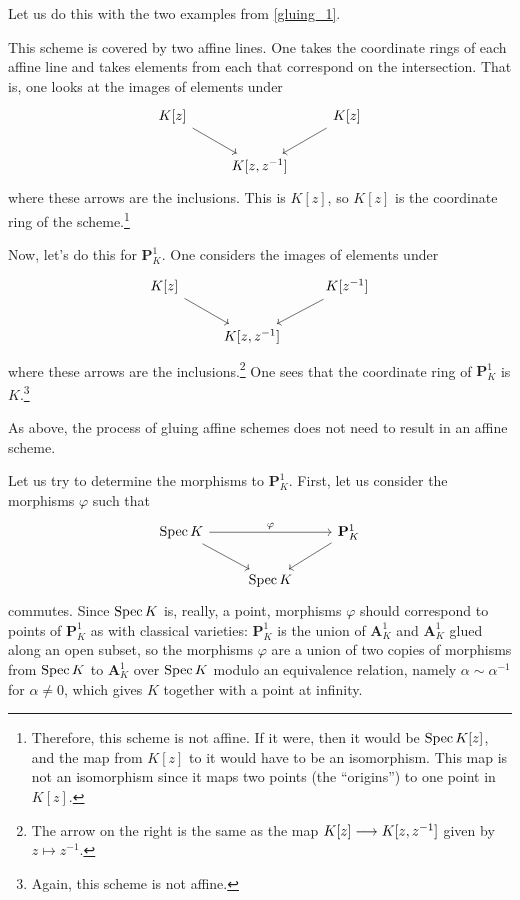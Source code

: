 \documentclass [11 pt, oneside] {article}
\begin{document}
Let us do this with the two examples from \cref{gluing_1}.

\begin{example}\label{}\text{}
This scheme is covered by two affine lines. One takes the coordinate rings of each affine line and takes elements from each that correspond on the intersection. That is, one looks at the images of elements under
\[
\begin{tikzcd}
	K[z]\ar[dr] && K[z] \ar[dl]\\
	&K[z,z^{-1}]
\end{tikzcd}
\]
where these arrows are the inclusions. This is $K[z]$, so $K[z]$ is the coordinate ring of the scheme.\footnote{Therefore, this scheme is not affine. If it were, then it would be $\operatorname{Spec} K[z]$, and the map from $K[z]$ to it would have to be an isomorphism. This map is not an isomorphism since it maps two points (the ``origins'') to one point in $K[z]$.}
\end{example}

\begin{example}[ ]\label{}\text{}
Now, let's do this for $\mathbf{P}^1_K$. One considers the images of elements under
\[
\begin{tikzcd}
        K[z]\ar[dr] && K[z^{-1}] \ar[dl]\\
        &K[z,z^{-1}]
\end{tikzcd}
\]
where these arrows are the inclusions.\footnote{The arrow on the right is the same as the map $K[z]\longrightarrow K[z,z^{-1}]$ given by $z\longmapsto z^{-1}$.} One sees that the coordinate ring of $\mathbf{P}^1_K$ is $K$.\footnote{Again, this scheme is not affine.}
\end{example}

\begin{remark}
	As above, the process of gluing affine schemes does not need to result in an affine scheme.
\end{remark}

Let us try to determine the morphisms to $\mathbf{P}^1_K$. First, let us consider the morphisms $\varphi$ such that 
\[
\begin{tikzcd}
	\Spec K \ar[dr]\ar[rr,"\varphi"] && \mathbf{P}^1_K\ar[dl]\\
					 &\Spec K
\end{tikzcd}
\]
commutes. Since $\operatorname{Spec} K$ is, really, a point, morphisms $\varphi$ should correspond to points of $\mathbf{P}^1_K$ as with classical varieties: $\mathbf{P}^1_K$ is the union of $\mathbf{A}^1_K$ and $\mathbf{A}^1_K$ glued along an open subset, so the morphisms $\varphi$ are a union of two copies of morphisms from $\operatorname{Spec} K$ to $\mathbf{A}^1_K$ over $\operatorname{Spec} K$ modulo an equivalence relation, namely $\alpha\sim \alpha ^{-1}$ for $\alpha\ne 0$, which gives $K$ together with a point at infinity.
\end{document}
